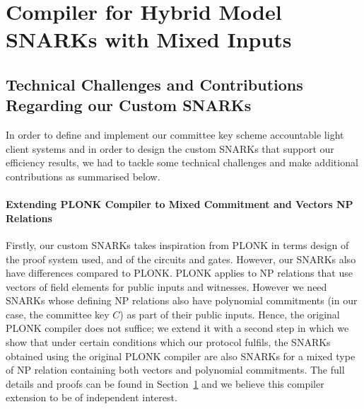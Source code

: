 \section{Compiler for Hybrid Model SNARKs with Mixed Inputs}
\label{sec_two_step_compiler}
\subsection{Technical Challenges and Contributions Regarding our Custom SNARKs} 
\label{sec:technical_challenges}

In order to define and implement our committee key scheme accountable light client systems and in order to design the custom SNARKs that support our efficiency results, 
we had to tackle some technical challenges and make additional contributions as summarised below.

\paragraph{Extending PLONK Compiler to Mixed Commitment and Vectors NP Relations} Firstly, our custom SNARKs takes inspiration from PLONK \cite{plonk} in terms design of the proof system used, and of the circuits and gates. However, our SNARKs also have differences compared to PLONK. PLONK applies to NP relations  that use  vectors of field elements for 
public inputs and witnesses.  However we need SNARKs whose defining NP relations also have  polynomial commitments (in our case, the committee key $C$) as part of their public inputs. Hence, the original PLONK compiler does not suffice; we extend it with a second step in which we show that under certain conditions which our protocol fulfils, the SNARKs obtained using the original PLONK compiler are also SNARKs for a mixed type of NP relation containing both vectors and polynomial commitments. The full details and proofs can be found in Section~\ref{sec_two_step_compiler} 
and we believe this compiler extension to be of independent interest. 

